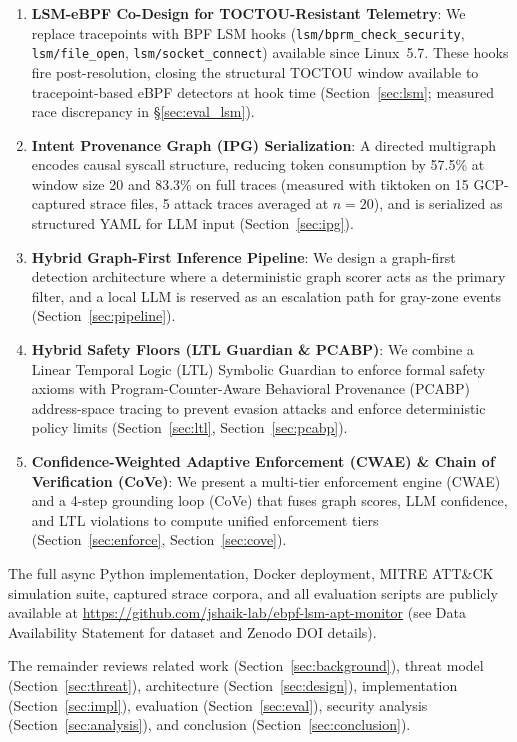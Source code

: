 \documentclass[journal]{IEEEtran}
\begin{document}
\begin{enumerate}
  \item \textbf{LSM-eBPF Co-Design for TOCTOU-Resistant Telemetry}: We replace
        tracepoints with BPF LSM hooks (\texttt{lsm/bprm\_check\_security},
        \texttt{lsm/file\_open}, \texttt{lsm/socket\_connect}) available since
        Linux~5.7. These hooks fire post-resolution, closing the structural
        TOCTOU window available to tracepoint-based eBPF detectors at hook time
        (Section~\ref{sec:lsm}; measured race discrepancy in \S\ref{sec:eval_lsm}).
  \item \textbf{Intent Provenance Graph (IPG) Serialization}: A directed multigraph
        encodes causal syscall structure, reducing token consumption by 57.5\% at window size 20
        and 83.3\% on full traces (measured with tiktoken on 15 GCP-captured strace files, 5 attack
        traces averaged at $n{=}20$), and is
        serialized as structured YAML for LLM input (Section~\ref{sec:ipg}).
  \item \textbf{Hybrid Graph-First Inference Pipeline}: We design a graph-first detection
        architecture where a deterministic graph scorer acts as the primary filter, and a local
        LLM is reserved as an escalation path for gray-zone events (Section~\ref{sec:pipeline}).
  \item \textbf{Hybrid Safety Floors (LTL Guardian \& PCABP)}: We combine a Linear Temporal Logic
        (LTL) Symbolic Guardian to enforce formal safety axioms with Program-Counter-Aware Behavioral
        Provenance (PCABP) address-space tracing to prevent evasion attacks and enforce deterministic
        policy limits (Section~\ref{sec:ltl}, Section~\ref{sec:pcabp}).
  \item \textbf{Confidence-Weighted Adaptive Enforcement (CWAE) \& Chain of Verification (CoVe)}:
        We present a multi-tier enforcement engine (CWAE) and a 4-step grounding loop (CoVe) that fuses
        graph scores, LLM confidence, and LTL violations to compute unified enforcement tiers (Section~\ref{sec:enforce}, Section~\ref{sec:cove}).
\end{enumerate}

\noindent The full async Python implementation, Docker deployment, MITRE
ATT\&CK simulation suite, captured strace corpora, and all evaluation
scripts are publicly available at
\url{https://github.com/jshaik-lab/ebpf-lsm-apt-monitor}
(see Data Availability Statement for dataset and Zenodo DOI details).

The remainder reviews related work (Section~\ref{sec:background}), threat model
(Section~\ref{sec:threat}), architecture (Section~\ref{sec:design}),
implementation (Section~\ref{sec:impl}), evaluation (Section~\ref{sec:eval}),
security analysis (Section~\ref{sec:analysis}), and conclusion
(Section~\ref{sec:conclusion}).
\end{document}
